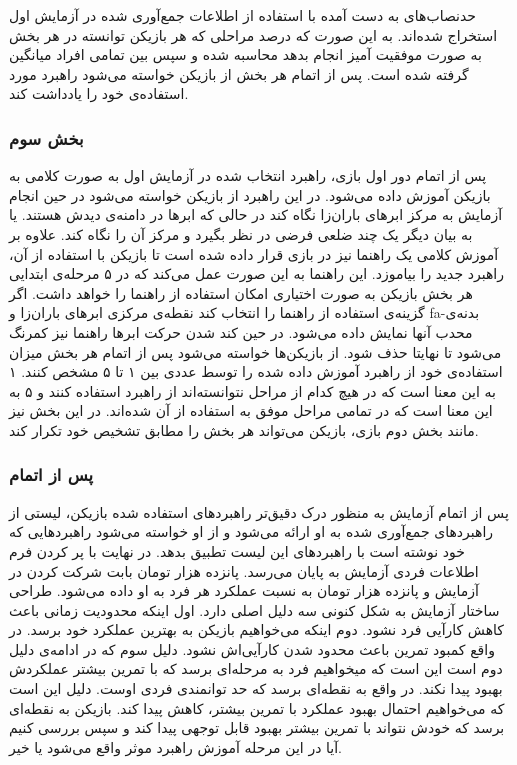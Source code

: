 \documentclass[twoside, a4paper,11pt]{book}
\numberwithin{equation}{chapter}
\numberwithin{table}{chapter}
\numberwithin{figure}{chapter}
\numberwithin{equation}{chapter}
\newcommand{\mls}[1]{\gls{fa-#1}\glsuseri{la-#1}}
\begin{document}
حدنصاب‌های به دست آمده با استفاده از اطلاعات جمع‌آوری شده در آزمایش اول استخراج شده‌اند. به این صورت که درصد مراحلی که هر بازیکن توانسته در هر بخش به صورت موفقیت آمیز انجام بدهد محاسبه شده و سپس بین تمامی افراد میانگین گرفته شده است. پس از اتمام هر بخش از بازیکن خواسته می‌شود راهبرد مورد استفاده‌ی خود را یادداشت کند.  

\subsubsection{بخش سوم} \label{partTwoMainTest:three}

پس از اتمام دور اول بازی، راهبرد انتخاب شده در آزمایش اول به صورت کلامی به بازیکن آموزش داده می‌شود. در این راهبرد از بازیکن خواسته می‌شود در حین انجام آزمایش به مرکز ابرهای باران‌زا نگاه کند در حالی که ابرها در دامنه‌ی دیدش هستند. یا به بیان دیگر یک چند ضلعی فرضی در نظر بگیرد و مرکز آن را نگاه کند. علاوه بر آموزش کلامی یک راهنما نیز در بازی قرار داده شده است تا بازیکن با استفاده از آن، راهبرد جدید را بیاموزد. این راهنما به این صورت عمل می‌کند که در ۵ مرحله‌ی ابتدایی هر بخش بازیکن به صورت اختیاری امکان استفاده از راهنما را خواهد داشت. اگر گزینه‌ی استفاده از راهنما را انتخاب کند نقطه‌ی مرکزی ابرهای باران‌زا و \mls{بدنه‌ی محدب} آنها نمایش داده می‌شود. در حین کند شدن حرکت ابرها راهنما نیز کمرنگ می‌شود تا نهایتا حذف شود. از بازیکن‌ها خواسته می‌شود پس از اتمام هر بخش میزان استفاده‌ی خود از راهبرد آموزش داده شده را توسط عددی بین ۱ تا ۵ مشخص کنند. ۱ به این معنا است که در هیچ کدام از مراحل نتوانسته‌اند از راهبرد استفاده کنند و ۵ به این معنا است که در تمامی مراحل موفق به استفاده از آن شده‌اند. در این بخش نیز مانند بخش دوم بازی، بازیکن می‌تواند هر بخش را مطابق تشخیص خود تکرار کند.

\subsubsection{پس از اتمام}

پس از اتمام آزمایش به منظور درک دقیق‌تر راهبردهای استفاده شده بازیکن، لیستی از راهبردهای جمع‌آوری شده به او ارائه می‌شود و از او خواسته می‌شود راهبردهایی که خود نوشته است با راهبردهای این لیست تطبیق بدهد. در نهایت با پر کردن فرم اطلاعات فردی آزمایش به پایان می‌رسد. پانزده هزار تومان بابت شرکت کردن در آزمایش و پانزده هزار تومان به نسبت عملکرد هر فرد به او داده می‌شود.
طراحی ساختار آزمایش به شکل کنونی سه دلیل اصلی دارد. اول اینکه محدودیت زمانی باعث کاهش کارآیی فرد نشود. دوم اینکه می‌خواهیم بازیکن به بهترین عملکرد خود برسد. در واقع کمبود تمرین باعث محدود شدن کارآیی‌اش نشود. دلیل سوم که در ادامه‌ی دلیل دوم است این است که میخواهیم فرد به مرحله‌ای برسد که با تمرین بیشتر عملکردش بهبود پیدا نکند. در واقع به نقطه‌ای برسد که حد توانمندی فردی اوست. دلیل این است که می‌خواهیم احتمال بهبود عملکرد با تمرین بیشتر، کاهش پیدا کند. بازیکن به نقطه‌ای برسد که خودش نتواند با تمرین بیشتر بهبود قابل توجهی پیدا کند و سپس بررسی کنیم آیا در این مرحله آموزش راهبرد موثر واقع می‌شود یا خیر.
\end{document}
